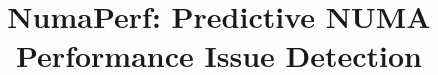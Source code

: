 \documentclass[sigplan,10pt,review,anonymous]{acmart}
\begin{document}
\title{NumaPerf: Predictive NUMA Performance Issue Detection}



\maketitle






{


}
\end{document}
